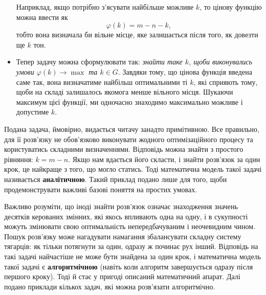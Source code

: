 \documentclass[a5paper,10pt]{book}
\begin{document}
\begin{itemize}
 Наприклад, якщо потрібно з'ясувати найбільше можливе $k$, то цінову функцію можна ввести як $$ \varphi(k) = m-n-k, $$ тобто вона визначала би вільне місце, яке залишається після того, як довезти ще $k$ тон.
 
 \item
 
 Тепер задачу можна сформулювати так: \textit{знайти таке $k$, щоби виконувались умови $\varphi(k) \rightarrow \max$ та $k \in G$}. Завдяки тому, що цінова функція введена саме так, вона визначатиме найбільш оптимальними ті $k$, які сприяють тому, щоби на складі залишалось якомога менше вільного місця. Шукаючи максимум цієї функції, ми одночасно знаходимо максимально можливе і допустиме $k$.

\end{itemize}

Подана задача, ймовірно, видається читачу занадто примітивною. Все правильно, для її розв'язку не обов'язково виконувати жодного оптимізаційного процесу та користуватись складними визначеннями. Відповідь можна знайти з простого рівняння: $k = m - n$. Якщо нам вдається його скласти, і знайти розв'язок за один крок, це найкраще з того, що могло статись. Тоді математична модель такої задачі називається \textbf{аналітичною}. Такий приклад подано лише для того, щоби продемонструвати важливі базові поняття на простих умовах.

Важливо розуміти, що іноді \flqq{}знайти розв'язок\frqq{} означає знаходження значень десятків керованих змінних, які якось впливають одна на одну, і в сукупності можуть змінювати свою оптимальність непередбачуваним і неочевидним чином. Пошук розв'язку може нагадувати намагання збалансувати складну систему тягарців: як тільки потягнути за один, одразу ж починає рух інший. Відповідь на такі задачі найчастіше не може бути знайдена за один крок, і математична модель такої задачі є \textbf{алгоритмічною} (навіть коли алгоритм завершується одразу після першого кроку). Тоді й стає у пригоді описаний математичний апарат. Далі подано приклади кількох задач, які можна розв'язати алгоритмічно.
\end{document}
